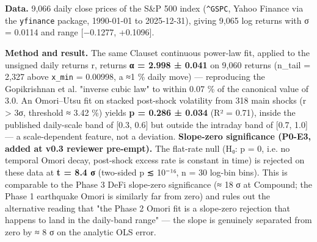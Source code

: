 \documentclass[
  11pt]{article}
\begin{document}
\textbf{Data.} 9,066 daily close prices of the S\&P 500 index
(\texttt{\^{}GSPC}, Yahoo Finance via the \texttt{yfinance} package,
1990-01-01 to 2025-12-31), giving 9,065 log returns with σ = 0.0114 and
range {[}−0.1277, +0.1096{]}.

\textbf{Method and result.} The same Clauset continuous power-law fit,
applied to the unsigned daily returns \textbar r\textbar, returns
\textbf{α = 2.998 ± 0.041} on 9,060 returns (n\_tail = 2,327 above
\texttt{x\_min} = 0.00998, a ≈1 \% daily move) --- reproducing the
Gopikrishnan et al. "inverse cubic law" to within 0.07 \% of the
canonical value of 3.0. An Omori--Utsu fit on stacked post-shock
volatility from 318 main shocks (\textbar r\textbar{} \textgreater{} 3σ,
threshold ≈ 3.42 \%) yields \textbf{p = 0.286 ± 0.034} (R² = 0.71),
inside the published daily-scale band of {[}0.3, 0.6{]} but outside the
intraday band of {[}0.7, 1.0{]} --- a scale-dependent feature, not a
deviation. \textbf{Slope-zero significance (P0-E3, added at v0.3
reviewer pre-empt).} The flat-rate null (H₀: p = 0, i.e. no temporal
Omori decay, post-shock excess rate is constant in time) is rejected on
these data at \textbf{\textbar t\textbar{} = 8.4 σ} (two-sided p ≲
10⁻¹⁶, n = 30 log-bin bins). This is comparable to the Phase 3 DeFi
slope-zero significance (≈ 18 σ at Compound; the Phase 1 earthquake
Omori is similarly far from zero) and rules out the alternative reading
that "the Phase 2 Omori fit is a slope-zero rejection that happens to
land in the daily-band range" --- the slope is genuinely separated from
zero by ≈ 8 σ on the analytic OLS error.
\end{document}
